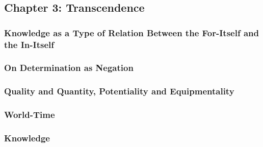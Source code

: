 \subsection{Chapter 3: Transcendence}

\subsubsection{Knowledge as a Type of Relation Between the For-Itself and the In-Itself}

\subsubsection{On Determination as Negation}

\subsubsection{Quality and Quantity, Potentiality and Equipmentality}

\subsubsection{World-Time}

\subsubsection{Knowledge}
